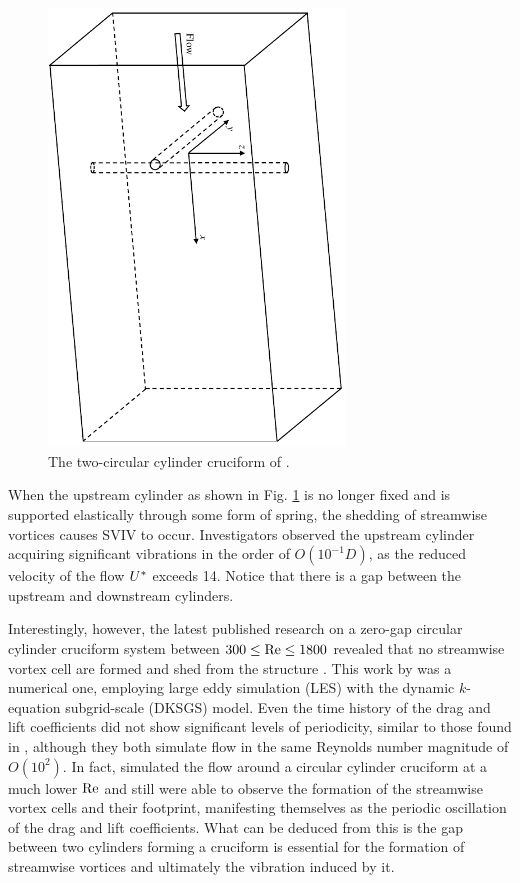 \documentclass[oneside]{utmthesis}
\begin{document}
\begin{figure}[!h]
  \centering
  \hspace{1cm} \includegraphics[angle=90,width=0.7\textwidth]{figs/twoCrossingCylinders}
  \caption{The two-circular cylinder cruciform of \citet{Zhao2018a}.}
  \label{fig:twoCrossingCylinders}
\end{figure}

\noindent When the upstream cylinder as shown in Fig. \ref{fig:twoCrossingCylinders} is no longer fixed and is supported elastically through some form of spring, the shedding of streamwise vortices causes SVIV to occur. Investigators observed the upstream cylinder acquiring significant vibrations in the order of $O(10^{-1}D)$, as the reduced velocity of the flow $U^{*}$ exceeds 14. Notice that there is a gap between the upstream and downstream cylinders.

Interestingly, however, the latest published research on a zero-gap circular cylinder cruciform system between $300 \le \text{Re} \le 1800$ revealed that no streamwise vortex cell are formed and shed from the structure \citep{Tang2021}. This work by \citet{Tang2021} was a numerical one, employing large eddy simulation (LES) with the dynamic $k$-equation subgrid-scale (DKSGS) model. Even the time history of the drag and lift coefficients did not show significant levels of periodicity, similar to those found in \citet{Deng2007}, although they both simulate flow in the same Reynolds number magnitude of $O(10^{2})$. In fact, \citet{Deng2007} simulated the flow around a circular cylinder cruciform at a much lower $\text{Re}$ and still were able to observe the formation of the streamwise vortex cells and their footprint, manifesting themselves as the periodic oscillation of the drag and lift coefficients. What can be deduced from this is the gap between two cylinders forming a cruciform is essential for the formation of streamwise vortices and ultimately the vibration induced by it.
\end{document}
